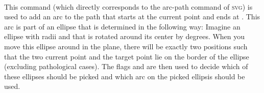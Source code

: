 \begin{command}{\pgfpatharcto{} \\}
    This command (which directly corresponds to the arc-path command of
    \textsc{svg}) is used to add an arc to the path that starts at the current
    point and ends at . This arc is part of an ellipse that
    is determined in the following way: Imagine an ellipse with radii
     and  that is rotated around its center by
     degrees. When you move this ellipse around in the plane,
    there will be exactly two positions such that the two current point and the
    target point lie on the border of the ellipse (excluding pathological
    cases). The flags  and  are then
    used to decide which of these ellipses should be picked and which arc on
    the picked ellipsis should be used.
\begin{codeexample}[]
\end{codeexample}
\end{command}
